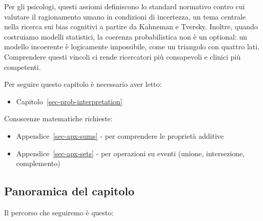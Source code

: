 \documentclass[
  italian,
  letterpaper,
  a4paper,
  11pt,
  open=any]{scrbook}
\providecommand{\tightlist}{%
  \setlength{\itemsep}{0pt}\setlength{\parskip}{0pt}}
\theoremstyle{plain}
\theoremstyle{definition}
\theoremstyle{definition}
\theoremstyle{remark}
\begin{document}
Per gli psicologi, questi assiomi definiscono lo standard normativo
contro cui valutare il ragionamento umano in condizioni di incertezza,
un tema centrale nella ricerca sui bias cognitivi a partire da Kahneman
e Tversky. Inoltre, quando costruiamo modelli statistici, la coerenza
probabilistica non è un optional: un modello incoerente è logicamente
impossibile, come un triangolo con quattro lati. Comprendere questi
vincoli ci rende ricercatori più consapevoli e clinici più competenti.

\begin{tcolorbox}[enhanced jigsaw, arc=.35mm, bottomrule=.15mm, bottomtitle=1mm, breakable, colback=white, colbacktitle=quarto-callout-tip-color!10!white, colframe=quarto-callout-tip-color-frame, coltitle=black, left=2mm, leftrule=.75mm, opacityback=0, opacitybacktitle=0.6, rightrule=.15mm, title=\textcolor{quarto-callout-tip-color}{\faLightbulb}\hspace{0.5em}{Prerequisiti}, titlerule=0mm, toprule=.15mm, toptitle=1mm]

Per seguire questo capitolo è necessario aver letto:

\begin{itemize}
\tightlist
\item
  Capitolo~\ref{sec-prob-interpretation}
\end{itemize}

Conoscenze matematiche richieste:

\begin{itemize}
\tightlist
\item
  Appendice~\ref{sec-apx-sums} - per comprendere le proprietà additive
\item
  Appendice~\ref{sec-apx-sets} - per operazioni su eventi (unione,
  intersezione, complemento)
\end{itemize}

\end{tcolorbox}

\subsection*{Panoramica del capitolo}\label{panoramica-del-capitolo}

Il percorso che seguiremo è questo:
\end{document}
